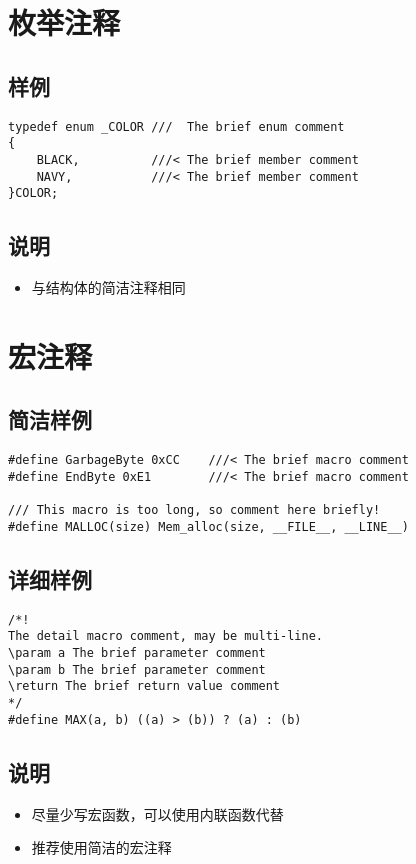 \documentclass[11pt,a4paper]{article}
\begin{document}
\section{枚举注释}
\subsection{样例}
\begin{lstlisting}[language={[ANSI]C}]
typedef enum _COLOR	///  The brief enum comment
{
	BLACK,			///< The brief member comment
	NAVY,			///< The brief member comment
}COLOR;
\end{lstlisting}
\subsection{说明}
\begin{itemize}
\item 与结构体的简洁注释相同
\end{itemize}
\section{宏注释}
\subsection{简洁样例}
\begin{lstlisting}[language={[ANSI]C}]
#define GarbageByte 0xCC	///< The brief macro comment
#define EndByte 0xE1		///< The brief macro comment

/// This macro is too long, so comment here briefly!
#define MALLOC(size) Mem_alloc(size, __FILE__, __LINE__)
\end{lstlisting}
\subsection{详细样例}
\begin{lstlisting}[language={[ANSI]C}]
/*!
The detail macro comment, may be multi-line.
\param a The brief parameter comment
\param b The brief parameter comment
\return The brief return value comment
*/
#define MAX(a, b) ((a) > (b)) ? (a) : (b)
\end{lstlisting}
\subsection{说明}
\begin{itemize}
\item 尽量少写宏函数，可以使用内联函数代替
\item 推荐使用简洁的宏注释
\end{itemize}
\end{document}
